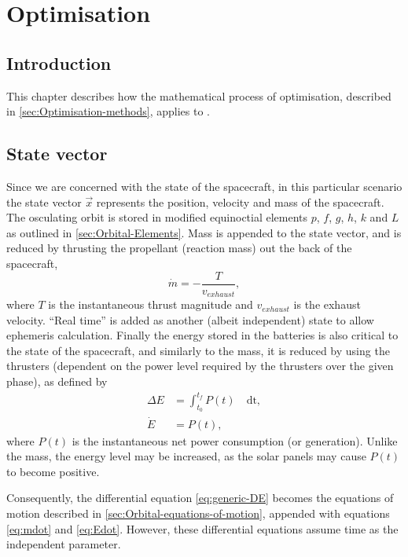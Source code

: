 \chapter{Optimisation} \label{cha:Optimisation}
\section{Introduction} \label{sec:Optimisation-Introduction}

This chapter describes how the mathematical process of optimisation, described in \autoref{sec:Optimisation-methods}, applies to \BW.

\section{State vector} \label{sec:state-vector}

Since we are concerned with the state of the spacecraft, in this particular scenario the state vector $\vec{x}$ represents the position, velocity and mass of the spacecraft. The osculating orbit is stored in modified equinoctial elements $p$, $f$, $g$, $h$, $k$ and $L$ as outlined in \autoref{sec:Orbital-Elements}. Mass is appended to the state vector, and is reduced by thrusting the propellant (reaction mass) out the back of the spacecraft, 
\begin{equation}
\dot{m}=-\frac{T}{v_{exhaust}} \label{eq:mdot},
\end{equation}
where $T$ is the instantaneous thrust magnitude and $v_{exhaust}$ is the exhaust velocity. \enquote{Real time} is added as another (albeit independent) state to allow ephemeris calculation. Finally the energy stored in the batteries is also critical to the state of the spacecraft, and similarly to the mass, it is reduced by using the thrusters (dependent on the power level required by the thrusters over the given phase), as defined by
\begin{subequations}\label{eq:edot}
\begin{align}
\Delta E &= \int_{t_0}^{t_f} P(t)\quad \text{dt} \label{eq:delta-E}, \\
\dot{E} &= P(t) \label{eq:Edot},
\end{align} 
\end{subequations} where $P(t)$ is the instantaneous net power consumption (or generation). Unlike the mass, the energy level may be increased, as the solar panels may cause $P(t)$ to become positive.

Consequently, the differential equation \eqref{eq:generic-DE} becomes the equations of motion described in \autoref{sec:Orbital-equations-of-motion}, appended with equations \eqref{eq:mdot} and \eqref{eq:Edot}. However, these differential equations assume time as the independent parameter.


